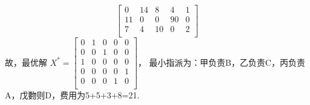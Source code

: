 \begin{solution}
$$\begin{bmatrix}
        0   & 14  & 8   & 4  & 1   \\
        11  & 0   & 0   & 90 & 0   \\
        7   & 4   & 10  & 0  & 2   \\
    \end{bmatrix}$$
    故，最优解
    $X^{*}=\begin{bmatrix}
        0  & 1  & 0  & 0  & 0 \\
        0  & 0  & 1  & 0  & 0 \\
        1  & 0  & 0  & 0  & 0 \\
        0  & 0  & 0  & 0  & 1 \\
        0  & 0  & 0  & 1  & 0 \\
    \end{bmatrix}$，
    最小指派为：甲负责B，乙负责C，丙负责A，戊覅则D，费用为5+5+3+8=21.
\end{solution}